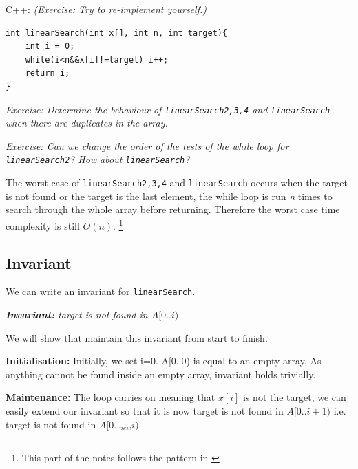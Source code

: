 C++: \textit{(Exercise:  Try to re-implement yourself.)}
\begin{lstlisting} 
int linearSearch(int x[], int n, int target){
    int i = 0;
    while(i<n&&x[i]!=target) i++;
    return i;
}
\end{lstlisting}

\textit{Exercise: Determine the behaviour of \texttt{linearSearch2,3,4} and \texttt{linearSearch} when there are duplicates in the array.}

\vspace{6mm}

\textit{Exercise: Can we change the order of the tests of the while loop for \texttt{linearSearch2}? How about \texttt{linearSearch}?}
\vspace{6mm}

The worst case of \texttt{linearSearch2,3,4} and \texttt{linearSearch} occurs when the target is not found or the target is the last element, the while loop is run \textit{n} times to search through the whole array before returning. Therefore the worst case time complexity is still $O(n)$.
\footnote{This part of the notes follows the pattern in \cite{ip:stringsearching}}

\if{}

\subsection*{Invariant}

We can write an invariant for \texttt{linearSearch}.

\begin{center}
    \textit{\textbf{Invariant:}\hspace{6mm} target is not found in $A[0..i)$}
\end{center}

We will show that maintain this invariant from start to finish. 
\vspace{6mm}

\textbf{Initialisation:} Initially, we set i=0. A[0..0) is equal to an empty array. As anything cannot be found inside an empty array, invariant holds trivially.
\vspace{6mm}

\textbf{Maintenance:} The loop carries on meaning that $x[i]$ is not the target, we can easily extend our invariant so that it is now target is not found in $A[0..i+1)$ i.e. target is not found in $A[0.._{new}i)$
\vspace{6mm}

